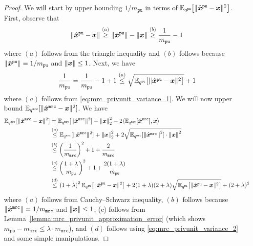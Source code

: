 \begin{proof}
We will start by upper bounding $1/m_{\texttt{pu}}$ in terms of $\mathbb{E}_{q^{\texttt{pu}}}\big[\|\hat{{\boldsymbol{x}}}^{\texttt{pu}} - {\boldsymbol{x}}\|^2\big]$. First, observe that
\begin{align}
    \|\hat{{\boldsymbol{x}}}^{\texttt{pu}} - {\boldsymbol{x}}\|  \stackrel{(a)}{\geq} \left\lVert \hat{{\boldsymbol{x}}}^{\texttt{pu}}\right\rVert - \left\lVert {\boldsymbol{x}} \right\rVert  \stackrel{(b)}{\geq}
    \frac{1}{m_{\texttt{pu}}}  - 1  \label{eq:mrc_privunit_variance_1}
\end{align}
where $(a)$ follows from the triangle inequality and $(b)$ follows because $\|\hat{{\boldsymbol{x}}}^{\texttt{pu}}\| = 1/m_{\texttt{pu}}$ and $\|{\boldsymbol{x}}\| \leq 1$. Next, we have
\begin{align}
    \frac{1}{m_{\texttt{pu}}} = \frac{1}{m_{\texttt{pu}}} - 1 + 1 \stackrel{(a)}{\leq} \sqrt{\mathbb{E}_{q^{\texttt{pu}}}\big[\|\hat{{\boldsymbol{x}}}^{\texttt{pu}} - {\boldsymbol{x}}\|^2\big]} + 1 \label{eq:mrc_privunit_variance_2}
\end{align}
where $(a)$ follows from \eqref{eq:mrc_privunit_variance_1}. We will now upper bound $\mathbb{E}_{q^{\texttt{mrc}}}[\| \hat{{\boldsymbol{x}}}^\texttt{mrc} - {\boldsymbol{x}}\|^2]$. We have
\begin{align}
    \mathbb{E}_{q^{\texttt{mrc}}}[\| \hat{{\boldsymbol{x}}}^\texttt{mrc} - {\boldsymbol{x}}\|^2] 
    & = \mathbb{E}_{q^{\texttt{mrc}}} [\| \hat{{\boldsymbol{x}}}^\texttt{mrc}\|^2] + \left\lVert {\boldsymbol{x}} \right\rVert^2_2 - 2\langle \mathbb{E}_{q^{\texttt{mrc}}} [\hat{{\boldsymbol{x}}}^\texttt{mrc}], {\boldsymbol{x}}\rangle \\
    & \stackrel{(a)}{\leq} \mathbb{E}_{q^{\texttt{mrc}}} [\| \hat{{\boldsymbol{x}}}^\texttt{mrc}\|^2] + \left\lVert {\boldsymbol{x}} \right\rVert^2_2 + 2\sqrt{ \mathbb{E}_{q^{\texttt{mrc}}} [\left\lVert \hat{{\boldsymbol{x}}}^\texttt{mrc} \right\rVert^2] \cdot \left\lVert {\boldsymbol{x}} \right\rVert^2 } \\
    & \stackrel{(b)}{\leq} \left(\frac{1}{m_\texttt{mrc}}\right)^2  + 1 + \frac{2}{m_\texttt{mrc}}\\
    & \stackrel{(c)}{\leq} \left(\frac{1+\lambda}{m_{\texttt{pu}}}\right)^2 + 1 + \frac{2(1+\lambda)}{m_{\texttt{pu}}} \\
    & \stackrel{(d)}{\leq}
     \left( 1+\lambda \right)^2  \mathbb{E}_{q^{\texttt{pu}}}\big[\|\hat{{\boldsymbol{x}}}^{\texttt{pu}} - {\boldsymbol{x}}\|^2\big] + 2(1+\lambda)(2+\lambda) \sqrt{\mathbb{E}_{q^{\texttt{pu}}}\big[\|\hat{{\boldsymbol{x}}}^{\texttt{pu}} - {\boldsymbol{x}}\|^2\big]} + (2+\lambda)^2
\end{align}
where $(a)$ follows from Cauchy–Schwarz inequality, $(b)$ follows because $\|\hat{{\boldsymbol{x}}}^\texttt{mrc}\| = 1/m_\texttt{mrc}$ and $\|{\boldsymbol{x}}\| \leq 1$, (c) follows from Lemma~\ref{lemma:mrc_privunit_approximation_error} (which shows $m_{\texttt{pu}} - m_\texttt{mrc} \leq \lambda\cdot m_\texttt{mrc}$), and $(d)$ follows using \eqref{eq:mrc_privunit_variance_2} and some simple manipulations.
\end{proof}


